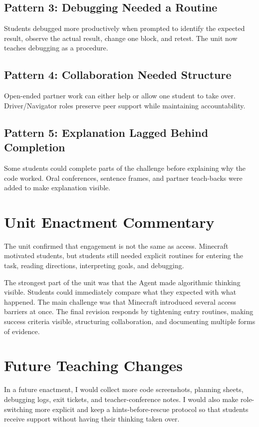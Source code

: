\documentclass[12pt]{article}
\begin{document}
\subsection{Pattern 3: Debugging Needed a Routine}
Students debugged more productively when prompted to identify the expected result, observe the actual result, change one block, and retest. The unit now teaches debugging as a procedure.

\subsection{Pattern 4: Collaboration Needed Structure}
Open-ended partner work can either help or allow one student to take over. Driver/Navigator roles preserve peer support while maintaining accountability.

\subsection{Pattern 5: Explanation Lagged Behind Completion}
Some students could complete parts of the challenge before explaining why the code worked. Oral conferences, sentence frames, and partner teach-backs were added to make explanation visible.

\section{Unit Enactment Commentary}
The unit confirmed that engagement is not the same as access. Minecraft motivated students, but students still needed explicit routines for entering the task, reading directions, interpreting goals, and debugging.

The strongest part of the unit was that the Agent made algorithmic thinking visible. Students could immediately compare what they expected with what happened. The main challenge was that Minecraft introduced several access barriers at once. The final revision responds by tightening entry routines, making success criteria visible, structuring collaboration, and documenting multiple forms of evidence.

\section{Future Teaching Changes}
In a future enactment, I would collect more code screenshots, planning sheets, debugging logs, exit tickets, and teacher-conference notes. I would also make role-switching more explicit and keep a hints-before-rescue protocol so that students receive support without having their thinking taken over.
\end{document}
